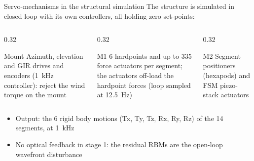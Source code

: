 \documentclass[10pt,aspectratio=169]{beamer}
\begin{document}
\begin{frame}{Servo-mechanisms in the structural simulation}
  The structure is simulated in closed loop with its own controllers, all holding \alert{zero set-points}:
  \vspace{2mm}
  \begin{columns}[T]
    \begin{column}{0.32\textwidth}
      \begin{block}{Mount}
        Azimuth, elevation and GIR drives and encoders (\SI{1}{kHz} controller): reject the wind torque on the mount
      \end{block}
    \end{column}
    \begin{column}{0.32\textwidth}
      \begin{block}{M1}
        6 hardpoints and up to 335 force actuators per segment; the actuators off-load the hardpoint forces (loop sampled at \SI{12.5}{Hz})
      \end{block}
    \end{column}
    \begin{column}{0.32\textwidth}
      \begin{block}{M2}
        Segment positioners (hexapods) and FSM piezo-stack actuators
      \end{block}
    \end{column}
  \end{columns}
  \vspace{4mm}

  \begin{itemize}
    \item Output: the 6 rigid body motions (Tx, Ty, Tz, Rx, Ry, Rz) of the 14 segments, at \SI{1}{kHz}
    \item No optical feedback in stage 1: the residual RBMs are the \alert{open-loop} wavefront disturbance
  \end{itemize}
\end{frame}
\end{document}
